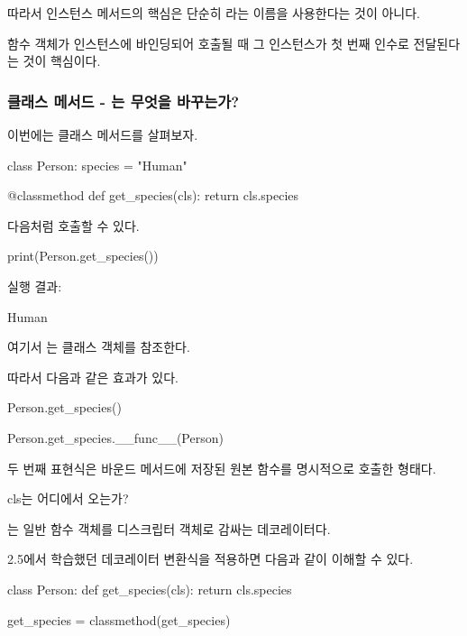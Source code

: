 따라서 인스턴스 메서드의 핵심은 단순히 라는 이름을 사용한다는 것이 아니다.

함수 객체가 인스턴스에 바인딩되어 호출될 때 그 인스턴스가 첫 번째 인수로 전달된다는 것이 핵심이다.

\subsubsection{클래스 메서드 - 는 무엇을 바꾸는가?}

이번에는 클래스 메서드를 살펴보자.

\begin{dhkcode}
class Person:
    species = "Human"

    @classmethod
    def get_species(cls):
        return cls.species
\end{dhkcode}

다음처럼 호출할 수 있다.

\begin{dhkcode}
print(Person.get_species())
\end{dhkcode}

실행 결과:

\begin{dhkzsh}
Human
\end{dhkzsh}

여기서 는  클래스 객체를 참조한다.

따라서 다음과 같은 효과가 있다.

\begin{dhkcode}
Person.get_species()

Person.get_species.__func__(Person)
\end{dhkcode}

두 번째 표현식은 바운드 메서드에 저장된 원본 함수를 명시적으로 호출한 형태다.

\begin{dhknote}
\begin{dhksmry}[centered]
cls는 어디에서 오는가?
\end{dhksmry}
\end{dhknote}

는 일반 함수 객체를  디스크립터 객체로 감싸는 데코레이터다.

2.5에서 학습했던 데코레이터 변환식을 적용하면 다음과 같이 이해할 수 있다.

\begin{dhkcode}
class Person:
    def get_species(cls):
        return cls.species

    get_species = classmethod(get_species)
\end{dhkcode}

